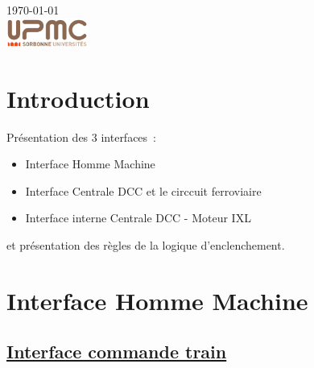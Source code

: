\begin{titlepage}
{\large \today}\\[2cm] %


\includegraphics[width=0.2\textwidth]{logo.png}


\vfill %

\end{titlepage}




\section{Introduction}
\label{sec:introduction}
Présentation des 3 interfaces~:
\begin{itemize}
\item Interface Homme Machine
\item Interface Centrale DCC et le circcuit ferroviaire
\item Interface interne Centrale DCC - Moteur IXL
\end{itemize}

et présentation des règles de la logique d'enclenchement.


\section{Interface Homme Machine}
\label{sec:int-dcc}

\subsection{\underline{Interface commande train}}
\label{sec:ihm-train}

